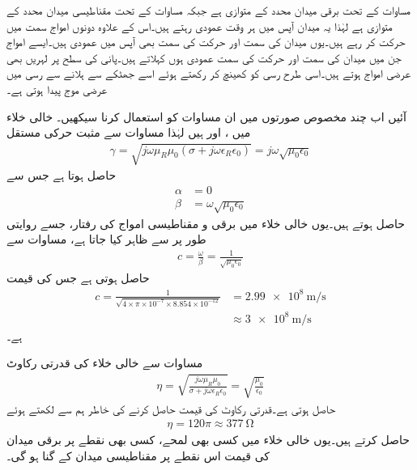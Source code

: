 مساوات  کے تحت برقی میدان  محدد کے متوازی ہے جبکہ مساوات  کے تحت مقناطیسی میدان  محدد کے متوازی ہے لہٰذا یہ میدان  آپس میں ہر وقت عمودی رہتے ہیں۔اس کے علاوہ دونوں امواج  سمت میں حرکت کر رہے ہیں۔یوں میدان کی سمت اور حرکت کی سمت بھی آپس میں عمودی ہیں۔ایسے امواج جن میں میدان کی سمت اور حرکت کی سمت عمودی ہوں  کہلاتے ہیں۔پانی کی سطح پر لہریں بھی عرضی امواج ہوتے ہیں۔اسی طرح رسی کو کھینچ کر رکھتے ہوئے اسے جھٹکے  سے ہلانے سے  رسی میں عرضی موج پیدا ہوتی ہے۔ 

آئیں اب چند مخصوص صورتوں میں ان مساوات کو استعمال کرنا سیکھیں۔
خالی خلاء میں ،  اور   ہیں لہٰذا مساوات  سے مثبت حرکی مستقل
\begin{align*}
\gamma=\sqrt{j \omega \mu_R \mu_0  \left(\sigma +j \omega \epsilon_R \epsilon_0 \right)}=j \omega \sqrt{\mu_0 \epsilon_0}
\end{align*}
حاصل ہوتا ہے جس سے
\begin{align*}
\alpha&=0\\
\beta&=\omega \sqrt{\mu_0 \epsilon_0}
\end{align*}
حاصل ہوتے ہیں۔یوں خالی خلاء میں برقی و مقناطیسی امواج کی رفتار، جسے روایتی طور پر  سے ظاہر کیا جاتا ہے،  مساوات  سے
\begin{align}
c=\frac{\omega}{\beta}=\frac{1}{\sqrt{\mu_0 \epsilon_0}}
\end{align}
حاصل ہوتی ہے جس کی قیمت
\begin{align*}
c=\frac{1}{\sqrt{4 \times \pi \times 10^{-7} \times 8.854 \times 10^{-12}}}&=\SI{2.99e8}{\meter \per \second} \\
&\approx \SI{3e8}{\meter \per \second}
\end{align*}
ہے۔

مساوات  سے خالی خلاء کی قدرتی رکاوٹ
\begin{align*}
\eta =\sqrt{\frac{j \omega \mu_R \mu_0}{\sigma +j \omega \epsilon_R \epsilon_0}}=\sqrt{\frac{\mu_0}{\epsilon_0}}
\end{align*}
حاصل ہوتی ہے۔قدرتی رکاوٹ کی قیمت حاصل کرنے کی خاطر ہم  سے  لکھتے ہوئے
\begin{align}
\eta=120 \pi \approx \SI{377}{\ohm}
\end{align}
حاصل کرتے ہیں۔یوں خالی خلاء میں کسی بھی لمحے، کسی بھی نقطے پر برقی میدان کی قیمت اس نقطے پر مقناطیسی میدان کے  گنا ہو گی۔

